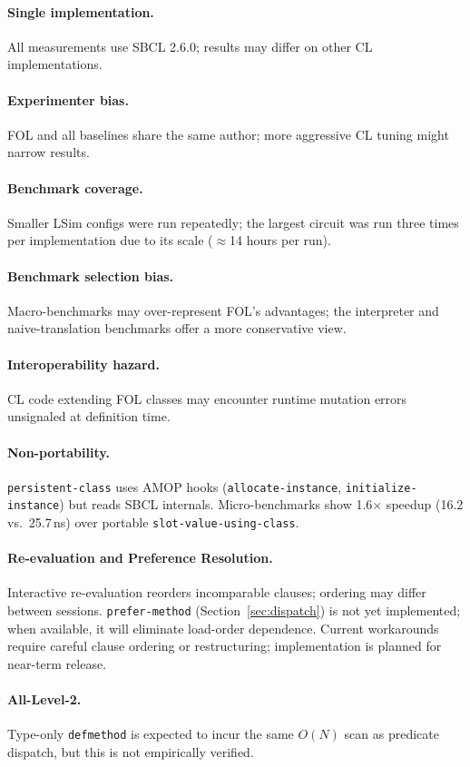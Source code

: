 \documentclass[sigconf,nonacm]{acmart}
\begin{document}
\begin{sloppypar}
\paragraph{Single implementation.} All measurements use SBCL 2.6.0; results may differ on other CL implementations.

\paragraph{Experimenter bias.} FOL and all baselines share the same author; more aggressive CL tuning might narrow results.

\paragraph{Benchmark coverage.} Smaller LSim configs were run repeatedly; the largest circuit was run three times per implementation due to its scale (${\approx}$14 hours per run).

\paragraph{Benchmark selection bias.} Macro-benchmarks may over-represent FOL's advantages; the interpreter and naive-translation benchmarks offer a more conservative view.

\paragraph{Interoperability hazard.} CL code extending FOL classes may encounter runtime mutation errors unsignaled at definition time.

\paragraph{Non-portability.} \texttt{persistent-class} uses AMOP hooks (\texttt{allocate-instance}, \allowbreak \texttt{initialize-instance}) but reads SBCL internals.
Micro-benchmarks show 1.6$\times$ speedup (16.2 vs.\ 25.7\,ns) over portable \texttt{slot-value-using-class}.

\paragraph{Re-evaluation and Preference Resolution.} Interactive re-evaluation reorders incomparable clauses; ordering may differ between sessions.
\texttt{prefer-method} (Section~\ref{sec:dispatch}) is not yet implemented; when available, it will eliminate load-order dependence.
Current workarounds require careful clause ordering or restructuring; implementation is planned for near-term release.

\paragraph{All-Level-2.} Type-only \texttt{defmethod} is expected to incur the same $O(N)$ scan as predicate dispatch, but this is not empirically verified.
\end{sloppypar}
\end{document}
